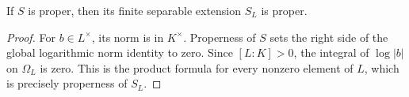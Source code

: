 \begin{proposition}\label{prop:separable-proper}
\leanok
{}
If $S$ is proper, then its finite separable extension $S_L$ is proper.
\end{proposition}
\begin{proof}
For $b\in L^\times$, its norm is in $K^\times$. Properness of $S$
sets the right side of the global logarithmic norm identity to zero.
Since $[L:K]>0$, the integral of $\log|b|$ on $\Omega_L$ is zero.
This is the product formula for every nonzero element of $L$, which
is precisely properness of $S_L$.
\end{proof}

